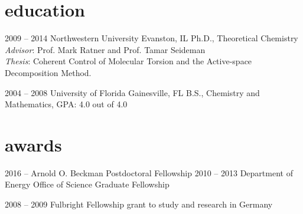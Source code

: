 \documentclass[resume]{parker-cv}
\begin{document}
\section{education}\vspace{-0.5em}

\begin{entrylist}
\entry
{2009 -- 2014}
{Northwestern University}
{Evanston, IL}
{
Ph.D., Theoretical Chemistry \\
\emph{Advisor}: Prof. Mark Ratner and Prof. Tamar Seideman \\
\emph{Thesis}: Coherent Control of Molecular Torsion and the Active-space Decomposition Method.}

\entry
{2004 -- 2008}
{University of Florida}
{Gainesville, FL}
{
B.S., Chemistry and Mathematics, GPA: 4.0 out of 4.0
}

\end{entrylist}

\vspace{0.25cm}
\section{awards} \vspace{-0.5em}
\begin{entrylist}
\vspace{-1em}
\entry
{2016 --}
{Arnold O. Beckman Postdoctoral Fellowship {\normalfont }}
{}
{}
\vspace{-1em}
\entry
{2010 -- 2013}
{Department of Energy Office of Science Graduate Fellowship {\normalfont }}
{}
{}

\entry
{2008 -- 2009}
{Fulbright Fellowship {\normalfont grant to study and research in Germany}}
{}
{}
\end{entrylist}
\end{document}
